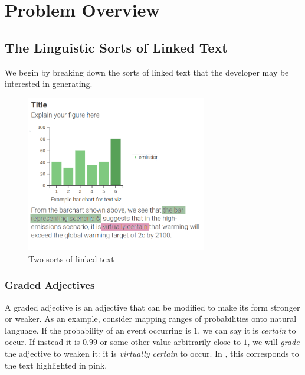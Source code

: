 \section{Problem Overview}
\label{sec:overview}

\subsection{The Linguistic Sorts of Linked Text}
We begin by breaking down the sorts of linked text that the developer may
be interested in generating. 

\begin{figure}
   \includegraphics[width=0.7\textwidth]{fig/text-viz-types.png}
   \caption{Two sorts of linked text}
   \label{fig:linked-text-types}
\end{figure}

\subsubsection{Graded Adjectives}
A graded adjective is an adjective that can be modified to make its form stronger or weaker.
As an example, consider mapping ranges of probabilities onto natural language. If the probability
of an event occurring is $1$, we can say it is \emph{certain} to occur. If instead it is $0.99$
or some other value arbitrarily close to $1$, we will \emph{grade} the adjective to weaken it:
it is \emph{virtually certain} to occur. In , this corresponds to the text
highlighted in pink.

